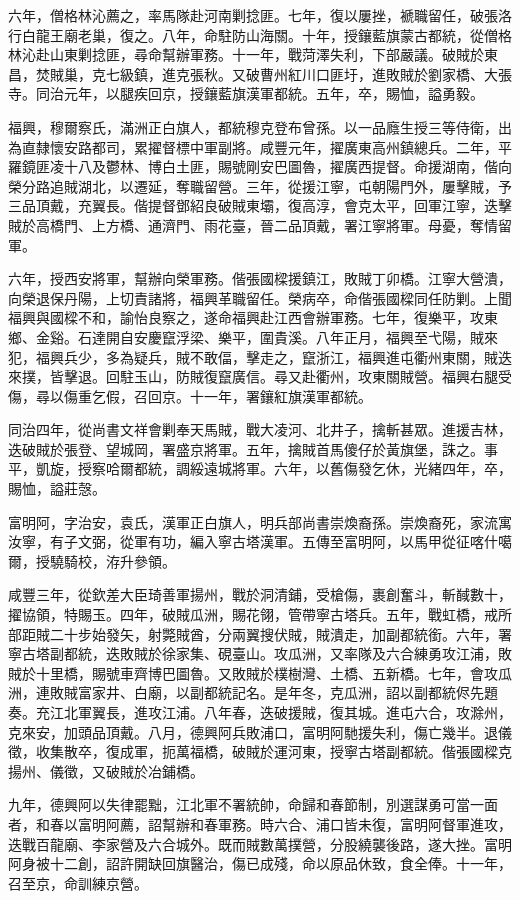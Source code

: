 \begin{pinyinscope}
六年，僧格林沁薦之，率馬隊赴河南剿捻匪。七年，復以屢挫，褫職留任，破張洛行白龍王廟老巢，復之。八年，命駐防山海關。十年，授鑲藍旗蒙古都統，從僧格林沁赴山東剿捻匪，尋命幫辦軍務。十一年，戰菏澤失利，下部嚴議。破賊於東昌，焚賊巢，克七級鎮，進克張秋。又破曹州紅川口匪圩，進敗賊於劉家橋、大張寺。同治元年，以腿疾回京，授鑲藍旗漢軍都統。五年，卒，賜恤，謚勇毅。

福興，穆爾察氏，滿洲正白旗人，都統穆克登布曾孫。以一品廕生授三等侍衛，出為直隸懷安路都司，累擢督標中軍副將。咸豐元年，擢廣東高州鎮總兵。二年，平羅鏡匪凌十八及鬱林、博白土匪，賜號剛安巴圖魯，擢廣西提督。命援湖南，偕向榮分路追賊湖北，以遷延，奪職留營。三年，從援江寧，屯朝陽門外，屢擊賊，予三品頂戴，充翼長。偕提督鄧紹良破賊東壩，復高淳，會克太平，回軍江寧，迭擊賊於高橋門、上方橋、通濟門、雨花臺，晉二品頂戴，署江寧將軍。母憂，奪情留軍。

六年，授西安將軍，幫辦向榮軍務。偕張國樑援鎮江，敗賊丁卯橋。江寧大營潰，向榮退保丹陽，上切責諸將，福興革職留任。榮病卒，命偕張國樑同任防剿。上聞福興與國樑不和，諭怡良察之，遂命福興赴江西會辦軍務。七年，復樂平，攻東鄉、金谿。石達開自安慶竄浮梁、樂平，圍貴溪。八年正月，福興至弋陽，賊來犯，福興兵少，多為疑兵，賊不敢偪，擊走之，竄浙江，福興進屯衢州東關，賊迭來撲，皆擊退。回駐玉山，防賊復竄廣信。尋又赴衢州，攻東關賊營。福興右腿受傷，尋以傷重乞假，召回京。十一年，署鑲紅旗漢軍都統。

同治四年，從尚書文祥會剿奉天馬賊，戰大凌河、北井子，擒斬甚眾。進援吉林，迭破賊於張登、望城岡，署盛京將軍。五年，擒賊首馬傻仔於黃旗堡，誅之。事平，凱旋，授察哈爾都統，調綏遠城將軍。六年，以舊傷發乞休，光緒四年，卒，賜恤，謚莊愨。

富明阿，字治安，袁氏，漢軍正白旗人，明兵部尚書崇煥裔孫。崇煥裔死，家流寓汝寧，有子文弼，從軍有功，編入寧古塔漢軍。五傳至富明阿，以馬甲從征喀什噶爾，授驍騎校，洊升參領。

咸豐三年，從欽差大臣琦善軍揚州，戰於洞清鋪，受槍傷，裹創奮斗，斬馘數十，擢協領，特賜玉。四年，破賊瓜洲，賜花翎，管帶寧古塔兵。五年，戰虹橋，戒所部距賊二十步始發矢，射斃賊酋，分兩翼搜伏賊，賊潰走，加副都統銜。六年，署寧古塔副都統，迭敗賊於徐家集、硯臺山。攻瓜洲，又率隊及六合練勇攻江浦，敗賊於十里橋，賜號車齊博巴圖魯。又敗賊於樸樹灣、土橋、五新橋。七年，會攻瓜洲，連敗賊富家井、白廟，以副都統記名。是年冬，克瓜洲，詔以副都統侭先題奏。充江北軍翼長，進攻江浦。八年春，迭破援賊，復其城。進屯六合，攻滁州，克來安，加頭品頂戴。八月，德興阿兵敗浦口，富明阿馳援失利，傷亡幾半。退儀徵，收集散卒，復成軍，扼萬福橋，破賊於運河東，授寧古塔副都統。偕張國樑克揚州、儀徵，又破賊於冶鋪橋。

九年，德興阿以失律罷黜，江北軍不署統帥，命歸和春節制，別選謀勇可當一面者，和春以富明阿薦，詔幫辦和春軍務。時六合、浦口皆未復，富明阿督軍進攻，迭戰百龍廟、李家營及六合城外。既而賊數萬撲營，分股繞襲後路，遂大挫。富明阿身被十二創，詔許開缺回旗醫治，傷已成殘，命以原品休致，食全俸。十一年，召至京，命訓練京營。


\end{pinyinscope}
